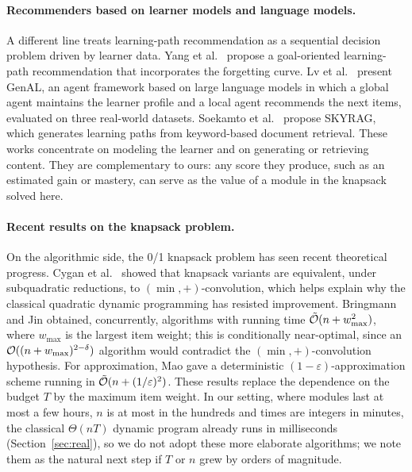 \paragraph{Recommenders based on learner models and language models.} A different line treats learning-path recommendation as a sequential decision problem driven by learner data. Yang et al.\ \cite{yang2026forgetting} propose a goal-oriented learning-path recommendation that incorporates the forgetting curve. Lv et al.\ \cite{lv2025genal} present GenAL, an agent framework based on large language models in which a global agent maintains the learner profile and a local agent recommends the next items, evaluated on three real-world datasets. Soekamto et al.\ \cite{soekamto2025skyrag} propose SKYRAG, which generates learning paths from keyword-based document retrieval. These works concentrate on modeling the learner and on generating or retrieving content. They are complementary to ours: any score they produce, such as an estimated gain or mastery, can serve as the value of a module in the knapsack solved here.

\paragraph{Recent results on the knapsack problem.} On the algorithmic side, the 0/1 knapsack problem has seen recent theoretical progress. Cygan et al.\ \cite{cygan2019minconv} showed that knapsack variants are equivalent, under subquadratic reductions, to $(\min,+)$-convolution, which helps explain why the classical quadratic dynamic programming has resisted improvement. Bringmann \cite{bringmann2024small} and Jin \cite{jin2024knapsack} obtained, concurrently, algorithms with running time $\tilde{\mathcal{O}}(n+w_{\max}^2)$, where $w_{\max}$ is the largest item weight; this is conditionally near-optimal, since an $\mathcal{O}((n+w_{\max})^{2-\delta})$ algorithm would contradict the $(\min,+)$-convolution hypothesis. For approximation, Mao \cite{mao2024fptas} gave a deterministic $(1-\varepsilon)$-approximation scheme running in $\tilde{\mathcal{O}}(n+(1/\varepsilon)^2)$. These results replace the dependence on the budget $T$ by the maximum item weight. In our setting, where modules last at most a few hours, $n$ is at most in the hundreds and times are integers in minutes, the classical $\Theta(nT)$ dynamic program already runs in milliseconds (Section~\ref{sec:real}), so we do not adopt these more elaborate algorithms; we note them as the natural next step if $T$ or $n$ grew by orders of magnitude.

